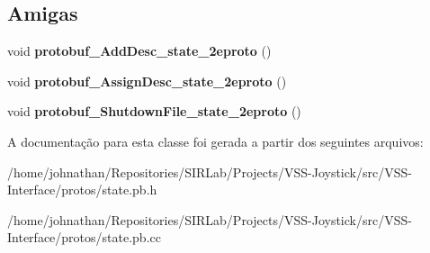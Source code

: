 \subsection*{Amigas}
\begin{DoxyCompactItemize}
\item 
void {\bfseries protobuf\+\_\+\+Add\+Desc\+\_\+state\+\_\+2eproto} ()\hypertarget{classvss__state_1_1Global__State_aab1a2c258f8122a403a979ff57e2a706}{}\label{classvss__state_1_1Global__State_aab1a2c258f8122a403a979ff57e2a706}

\item 
void {\bfseries protobuf\+\_\+\+Assign\+Desc\+\_\+state\+\_\+2eproto} ()\hypertarget{classvss__state_1_1Global__State_a57d9367bc8a7a94ead11d11194cca1b6}{}\label{classvss__state_1_1Global__State_a57d9367bc8a7a94ead11d11194cca1b6}

\item 
void {\bfseries protobuf\+\_\+\+Shutdown\+File\+\_\+state\+\_\+2eproto} ()\hypertarget{classvss__state_1_1Global__State_a4e6dc5e8e72799859c4e9556d090e57d}{}\label{classvss__state_1_1Global__State_a4e6dc5e8e72799859c4e9556d090e57d}

\end{DoxyCompactItemize}


A documentação para esta classe foi gerada a partir dos seguintes arquivos\+:\begin{DoxyCompactItemize}
\item 
/home/johnathan/\+Repositories/\+S\+I\+R\+Lab/\+Projects/\+V\+S\+S-\/\+Joystick/src/\+V\+S\+S-\/\+Interface/protos/state.\+pb.\+h\item 
/home/johnathan/\+Repositories/\+S\+I\+R\+Lab/\+Projects/\+V\+S\+S-\/\+Joystick/src/\+V\+S\+S-\/\+Interface/protos/state.\+pb.\+cc\end{DoxyCompactItemize}
